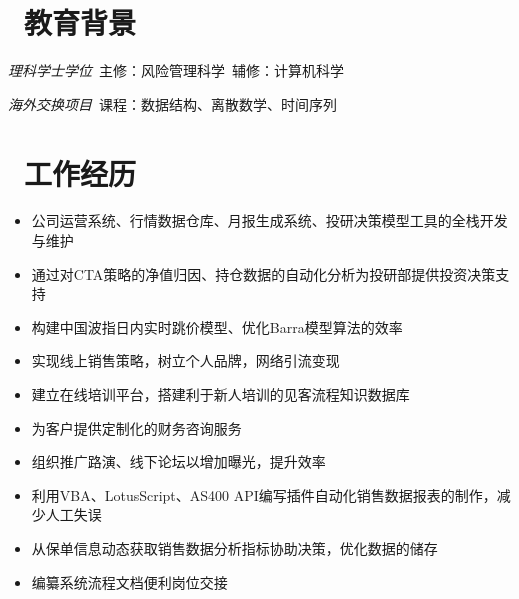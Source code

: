 \documentclass{resume}
\begin{document}



\section{\faGraduationCap\ 教育背景}

\textit{理科学士学位}\ 主修：风险管理科学\ 辅修：计算机科学

\textit{海外交换项目}\ 课程：数据结构、离散数学、时间序列

\section{\faSuitcase\ 工作经历}
\begin{itemize}
  \item 公司运营系统、行情数据仓库、月报生成系统、投研决策模型工具的全栈开发与维护
  \item 通过对CTA策略的净值归因、持仓数据的自动化分析为投研部提供投资决策支持
  \item 构建中国波指日内实时跳价模型、优化Barra模型算法的效率
\end{itemize}

\begin{itemize}
  \item 实现线上销售策略，树立个人品牌，网络引流变现
  \item 建立在线培训平台，搭建利于新人培训的见客流程知识数据库
\end{itemize}

\begin{itemize}
  \item 为客户提供定制化的财务咨询服务
  \item 组织推广路演、线下论坛以增加曝光，提升效率
\end{itemize}

\role{实习生}{业务数据的处理与分析}
\begin{itemize}
  \item 利用VBA、LotusScript、AS400 API编写插件自动化销售数据报表的制作，减少人工失误
  \item 从保单信息动态获取销售数据分析指标协助决策，优化数据的储存
  \item 编纂系统流程文档便利岗位交接
\end{itemize}
\end{document}
